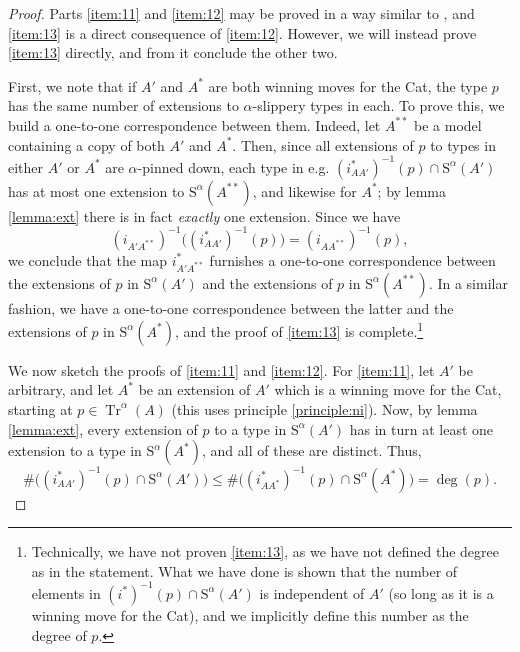\documentclass{article}
\theoremstyle{nonumberplain}
\newtheorem{proof}{Proof}
\newcommand{\Stone}{\mathrm{S}}
\DeclareMathOperator{\Tr}{Tr}
\begin{document}
\begin{proof}
Parts \ref{item:11} and \ref{item:12} may be proved in a way similar to \cite{morley}, and \ref{item:13} is a direct consequence of \ref{item:12}. However, we will instead prove \ref{item:13} directly, and from it conclude the other two.

First, we note that if $A'$ and $A^*$ are both winning moves for the Cat, the type $p$ has the same number of extensions to $\alpha$-slippery types in each. To prove this, we build a one-to-one correspondence between them. Indeed, let $A^{**}$ be a model containing a copy of both $A'$ and $A^*$. Then, since all extensions of $p$ to types in either $A'$ or $A^*$ are $\alpha$-pinned down, each type in e.g. $(i_{AA'}^*)^{-1}(p) \cap \Stone^\alpha(A')$ has at most one extension to $\Stone^\alpha(A^{**})$, and likewise for $A^*$; by lemma \ref{lemma:ext} there is in fact \emph{exactly} one extension. Since we have
\begin{equation}
(i_{A'A^{**}})^{-1}\big( (i_{AA'}^*)^{-1}(p) \big) = (i_{AA^{**}})^{-1}(p),
\end{equation}
we conclude that the map $i_{A'A^{**}}^*$ furnishes a one-to-one correspondence between the extensions of $p$ in $\Stone^\alpha(A')$ and the extensions of $p$ in $\Stone^\alpha(A^{**})$. In a similar fashion, we have a one-to-one correspondence between the latter and the extensions of $p$ in $\Stone^\alpha(A^*)$, and the proof of \ref{item:13} is complete.\footnote{Technically, we have not proven \ref{item:13}, as we have not defined the degree as in the statement. What we have done is shown that the number of elements in $(i^*)^{-1}(p) \cap \Stone^\alpha(A')$ is independent of $A'$ (so long as it is a winning move for the Cat), and we implicitly define this number as the degree of $p$.}

We now sketch the proofs of \ref{item:11} and \ref{item:12}. For \ref{item:11}, let $A'$ be arbitrary, and let $A^*$ be an extension of $A'$ which is a winning move for the Cat, starting at $p \in \Tr^\alpha(A)$ (this uses principle \ref{principle:ni}). Now, by lemma \ref{lemma:ext}, every extension of $p$ to a type in $\Stone^\alpha(A')$ has in turn at least one extension to a type in $\Stone^\alpha(A^*)$, and all of these are distinct. Thus,
\begin{equation}
\#\big((i_{AA'}^*)^{-1}(p) \cap \Stone^\alpha(A') \big) \leq \#\big((i_{AA^*}^*)^{-1}(p) \cap \Stone^\alpha(A^*) \big) = \deg(p).
\end{equation}


\end{proof}
\end{document}
